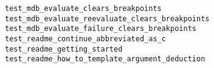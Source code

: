 \begin{description}
    \item[\texttt{test\_mdb\_evaluate\_clears\_breakpoints}]
    \item[\texttt{test\_mdb\_evaluate\_reevaluate\_clears\_breakpoints}]
    \item[\texttt{test\_mdb\_evaluate\_failure\_clears\_breakpoints}]
    \item[\texttt{test\_readme\_continue\_abbreviated\_as\_c}]
    \item[\texttt{test\_readme\_getting\_started}]
    \item[\texttt{test\_readme\_how\_to\_template\_argument\_deduction}]
\end{description}


